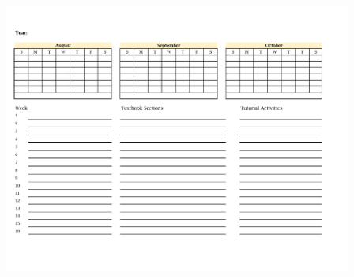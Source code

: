 \mypage
\begin{mybox}[width=\textwidth]

\includegraphics[width=4.5in,height=7in]{Calendar1.pdf}

\end{mybox}
\mypage

